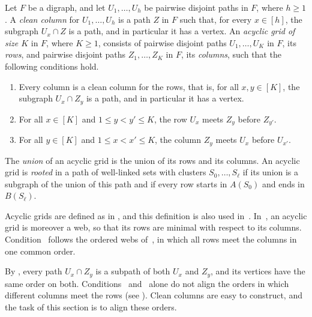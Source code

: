 \documentclass[fontsize=12pt,leading=14pt]{fullpaper}
\begin{document}
\begin{definition}\label{def:s3-grid}
  Let $F$ be a digraph, and let $U_1,\dots,U_h$ be pairwise disjoint paths in $F$, where $h\ge1$.
  A \emph{clean column} for $U_1,\dots,U_h$ is a path $Z$ in $F$ such that, for every $x\in[h]$, the subgraph $U_x\cap Z$ is a path, and in particular it has a vertex.
  An \emph{acyclic grid of size $K$} in $F$, where $K\ge1$, consists of pairwise disjoint paths $U_1,\dots,U_K$ in $F$, its \emph{rows}, and pairwise disjoint paths $Z_1,\dots,Z_K$ in $F$, its \emph{columns}, such that the following conditions hold.
  \begin{enumerate}[label=\textnormal{(W\arabic*)}]
    \item\label{item:s3-W1} Every column is a clean column for the rows, that is, for all $x,y\in[K]$, the subgraph $U_x\cap Z_y$ is a path, and in particular it has a vertex.
    \item\label{item:s3-W2} For all $x\in[K]$ and $1\le y<y'\le K$, the row $U_x$ meets $Z_y$ before $Z_{y'}$.
    \item\label{item:s3-W3} For all $y\in[K]$ and $1\le x<x'\le K$, the column $Z_y$ meets $U_x$ before $U_{x'}$.
  \end{enumerate}
  The \emph{union} of an acyclic grid is the union of its rows and its columns.
  An acyclic grid is \emph{rooted} in a path of well-linked sets with clusters $S_0,\dots,S_\ell$ if its union is a subgraph of the union of this path and if every row starts in $A(S_0)$ and ends in $B(S_\ell)$.
\end{definition}

Acyclic grids are defined as in \textcite[Section~4, before~(4.5)]{ReedRST96}, and this definition is also used in~\cite[Definition~3.7]{HKMM26a}.
In~\cite[Definition~5.3]{KawarabayashiK15}, an acyclic grid is moreover a web, so that its rows are minimal with respect to its columns.
Condition~ follows the ordered webs of~\cite[Definition~9.1]{HKMM26a}, in which all rows meet the columns in one common order.

By , every path $U_x\cap Z_y$ is a subpath of both $U_x$ and $Z_y$, and its vertices have the same order on both.
Conditions~ and~ alone do not align the orders in which different columns meet the rows (see ).
Clean columns are easy to construct, and the task of this section is to align these orders.
\end{document}
